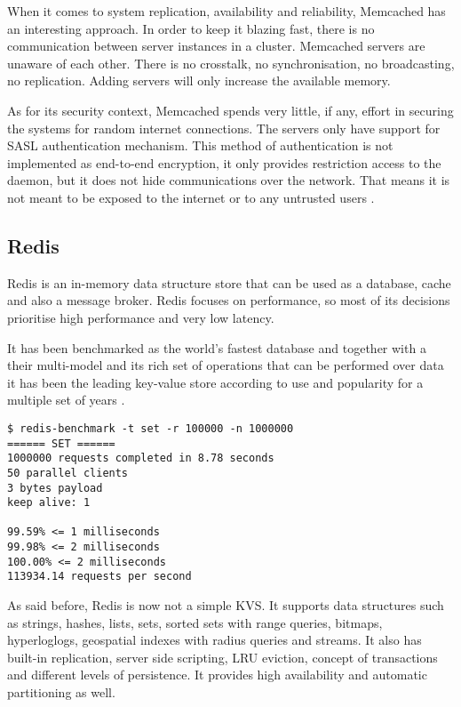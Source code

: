 When it comes to system replication, availability and reliability, Memcached has an interesting approach. In order to keep it blazing fast, there is no communication between server instances in a cluster. Memcached servers are unaware of each other. There is no crosstalk, no synchronisation, no broadcasting, no replication. Adding servers will only increase the available memory.

As for its security context, Memcached spends very little, if any, effort in securing the systems for random internet connections. The servers only have support for \gls{SASL} \cite{sasl:1} authentication mechanism. This method of authentication is not implemented as end-to-end encryption, it only provides restriction access to the daemon, but it does not hide communications over the network. That means it is not meant to be exposed to the internet or to any untrusted users \cite{memcached:2}.

\subsection{Redis} %
\label{ssec:redis}

Redis \cite{redis:1} is an in-memory data structure store that can be used as a database, cache and also a message broker. Redis focuses on performance, so most of its decisions prioritise high performance and very low latency.

It has been benchmarked as the world's fastest database \cite{redis:3} and together with a their multi-model and its rich set of operations that can be performed over data it has been the leading key-value store according to use and popularity for a multiple set of years \cite{db-engine:2}.

\lstset{language=Bash, caption=How Fast is Redis, label=lst:redisBenchmark}
\begin{lstlisting}
$ redis-benchmark -t set -r 100000 -n 1000000
====== SET ======
1000000 requests completed in 8.78 seconds
50 parallel clients
3 bytes payload
keep alive: 1

99.59% <= 1 milliseconds
99.98% <= 2 milliseconds
100.00% <= 2 milliseconds
113934.14 requests per second
\end{lstlisting}

As said before, Redis is now not a simple \gls{KVS}. It supports data structures such as strings, hashes, lists, sets, sorted sets with range queries, bitmaps, hyperloglogs, geospatial indexes with radius queries and streams. It also has built-in replication, server side scripting, \gls{LRU} eviction, concept of transactions and different levels of persistence. It provides high availability and automatic partitioning as well.

